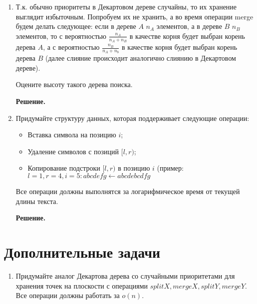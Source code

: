 \begin{enumerate}
	
	
	\item Т.к. обычно приоритеты в Декартовом дереве случайны, то их хранение выглядит избыточным.
	Попробуем их не хранить, а во время операции merge будем делать следующее: если в дереве
	$A$ $n_A$ элементов, а в дереве $B$ $n_B$ элементов, то с вероятностью 
	$\frac{n_A}{n_A + n_B}$ в качестве корня будет выбран корень дерева $A$, а с вероятностью 
	$\frac{n_B}{n_A + n_b}$ в качестве корня будет выбран корень дерева $B$ (далее слияние 
	происходит аналогично слиянию в Декартовом дереве).
	
	Оцените высоту такого дерева поиска.
	
	\textbf{Решение.}
	
	
	
	\item Придумайте структуру данных, которая поддерживает следующие операции:
	
	\begin{itemize}
		\item Вставка символа на позицию $i$;
		\item Удаление символов с позиций $[l, r)$;
		\item Копирование подстроки $[l, r)$ в позицию $i$ (пример: $l = 1, r = 4, i = 5 : abcdefg \leftarrow abcdebcdfg$
	\end{itemize}
	
	Все операции должны выполнятся за логарифмическое время от текущей длины текста.
	
	\textbf{Решение.}
	
	
\end{enumerate}

\section*{Дополнительные задачи}
\begin{enumerate}
	\item Придумайте аналог Декартова дерева со случайными приоритетами для хранения точек на плоскости с операциями $splitX, mergeX, splitY, mergeY$. Все операции должны работать за $o(n)$.
\end{enumerate}

